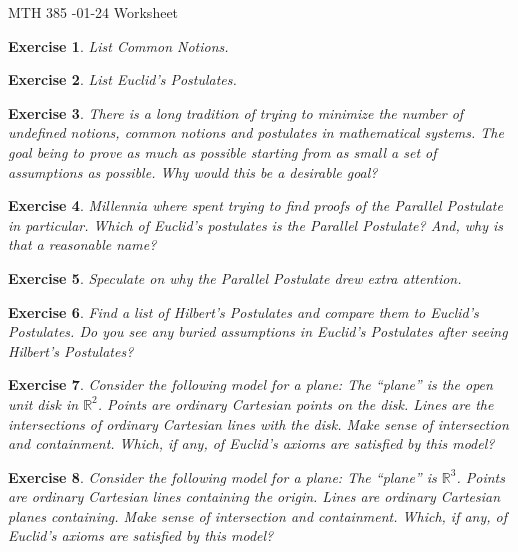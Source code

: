 \documentclass[12pt]{article}
\theoremstyle{plain}
\newtheorem{ex}{Exercise}
\begin{document}
MTH 385 -01-24 Worksheet

\begin{ex}
  List Common Notions.
\end{ex}

\begin{ex}
  List Euclid's Postulates.
\end{ex}

\begin{ex}
  There is a long tradition of trying to minimize the number of undefined notions, common notions and postulates in mathematical systems. The goal being to prove as much as possible starting from as small a set of assumptions as possible. Why would this be a desirable goal?
\end{ex}

\begin{ex}
  Millennia where spent trying to find proofs of the Parallel Postulate in particular. Which of Euclid's postulates is the Parallel Postulate? And, why is that a reasonable name?
\end{ex}

\begin{ex}
  Speculate on why the Parallel Postulate drew extra attention.
\end{ex}

\begin{ex}
  Find a list of Hilbert's Postulates and compare them to Euclid's Postulates. Do you see any  buried assumptions in Euclid's Postulates after seeing Hilbert's Postulates?
\end{ex}

\begin{ex}
  Consider the following model for a plane: The ``plane'' is the open unit disk in $\mathbb{R}^2$. Points are ordinary Cartesian points on the disk. Lines are the intersections of ordinary Cartesian lines with the disk. Make sense of intersection and containment. Which, if any, of Euclid's axioms are satisfied by this model?
\end{ex}

\begin{ex}
  Consider the following model for a plane: The ``plane'' is $\mathbb{R}^3$. Points are ordinary Cartesian lines containing the origin. Lines are ordinary Cartesian planes containing. Make sense of intersection and containment. Which, if any, of Euclid's axioms are satisfied by this model?
\end{ex}
\end{document}
